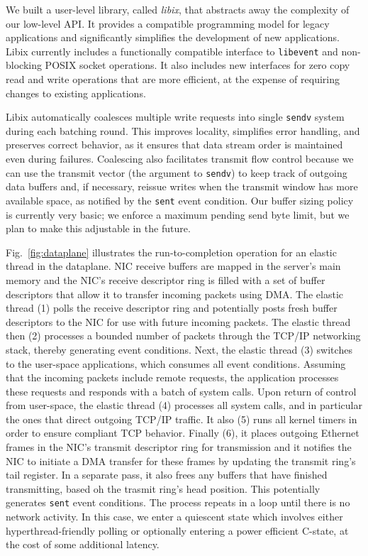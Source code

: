 We built a user-level library, called \emph{libix}, that abstracts
away the complexity of our low-level API. It provides a compatible
programming model for legacy applications and significantly simplifies
the development of new applications. Libix currently includes a
functionally compatible interface to \texttt{libevent} and
non-blocking POSIX socket operations. It also includes new interfaces
for zero copy read and write operations that are more efficient, at
the expense of requiring changes to existing applications.

Libix automatically coalesces multiple write requests into single
\texttt{sendv} system during each batching round. This improves
locality, simplifies error handling, and preserves correct behavior,
as it ensures that data stream order is maintained even during failures.
Coalescing also facilitates transmit flow control because
we can use the transmit vector (the argument to \texttt{sendv})
to keep track of outgoing data buffers and, if necessary, reissue
writes when the transmit window has more available space, as notified
by the \texttt{sent} event condition. Our buffer sizing policy is currently
very basic; we enforce a maximum pending send byte limit, but
we plan to make this adjustable in the future.


% 

Fig.~\ref{fig:dataplane} illustrates the run-to-completion operation
for an elastic thread in the \ix dataplane. NIC receive buffers are
mapped in the server's main memory and the NIC's receive descriptor
ring is filled with a set of buffer descriptors that allow it to
transfer incoming packets using DMA\@.  The elastic thread (1) polls
the receive descriptor ring and potentially posts fresh buffer
descriptors to the NIC for use with future incoming packets. The
elastic thread then (2) processes a bounded number of packets through
the TCP/IP networking stack, thereby generating event
conditions. Next, the elastic thread (3) switches to the user-space
applications, which consumes all event conditions. Assuming that the
incoming packets include remote requests, the application processes
these requests and responds with a batch of system calls. Upon return
of control from user-space, the elastic thread (4) processes all
system calls, and in particular the ones that direct outgoing TCP/IP
traffic. It also (5) runs all kernel timers in order to ensure
compliant TCP behavior. Finally (6), it places outgoing Ethernet
frames in the NIC's transmit descriptor ring for transmission and it
notifies the NIC to initiate a DMA transfer for these frames by
updating the transmit ring's tail register. In a separate pass, it
also frees any buffers that have finished transmitting, based oh the
trasmit ring's head position. This potentially generates \texttt{sent}
event conditions.  The process repeats in a loop until there is no
network activity. In this case, we enter a quiescent state which
involves either hyperthread-friendly polling or optionally entering a
power efficient C-state, at the cost of some additional latency.


